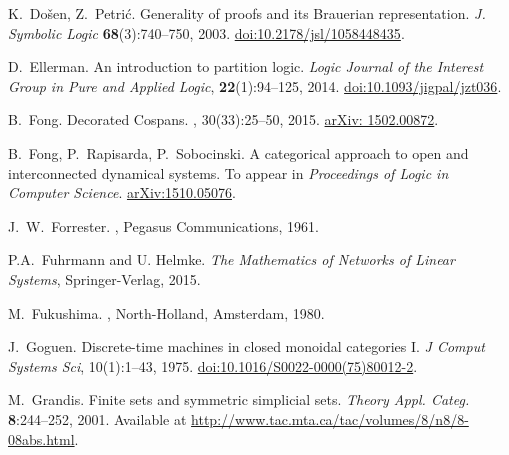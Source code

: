 \begin{thebibliography}{RSW00}
    K.\ Do\v{s}en, Z.\ Petri\'c.
    \newblock Generality of proofs and its Brauerian representation.
    \newblock \textsl{J. Symbolic Logic} {\bf 68}(3):740--750, 2003.
    \newblock
    \href{http://doi.org/10.2178/jsl/1058448435}{doi:10.2178/jsl/1058448435}.

  D.\ Ellerman.
  \newblock An introduction to partition logic.
  \newblock \textsl{Logic Journal of the Interest Group in Pure and Applied
  Logic}, {\bf 22}(1):94--125, 2014.
  \newblock
  \href{http://doi.org/10.1093/jigpal/jzt036}{doi:10.1093/jigpal/jzt036}.


    B.\ Fong.
    \newblock Decorated Cospans.
    , 30(33):25--50, 2015.
    \newblock \href{http://arxiv.org/abs/1502.00872}{arXiv: 1502.00872}.

    B.\ Fong, P.\ Rapisarda, P.\ Sobocinski.
    \newblock A categorical approach to open and interconnected dynamical
    systems.
    \newblock To appear in {\sl Proceedings of Logic in Computer Science}.
    \newblock \href{http://arxiv.org/abs/1510.05076}{arXiv:1510.05076}.

    J.\ W.\ Forrester.
    , Pegasus Communications, 1961. 


    P.A.~Fuhrmann and U. Helmke.
    \newblock \emph{The Mathematics of Networks of Linear Systems},
    Springer-Verlag, 2015. 

    M.\ Fukushima.
    ,
    North-Holland, Amsterdam, 1980.

    J.\ Goguen.
    \newblock Discrete-time machines in closed monoidal categories I.
    \newblock \emph{J Comput Systems Sci}, 10(1):1--43, 1975.
    \newblock
    \href{http://doi.org/10.1016/S0022-0000(75)80012-2}{doi:10.1016/S0022-0000(75)80012-2}.

    M.\ Grandis.
    \newblock Finite sets and symmetric simplicial sets.
    \newblock \textsl{Theory Appl. Categ.} {\bf 8}:244--252, 2001.
    \newblock Available at
    \href{http://www.tac.mta.ca/tac/volumes/8/n8/8-08abs.html}
    {http://www.tac.mta.ca/tac/volumes/8/n8/8-08abs.html}.


\end{thebibliography}
